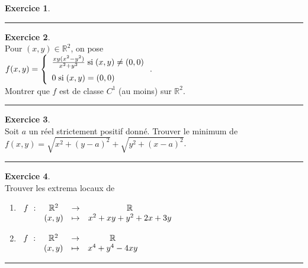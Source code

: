 \documentclass[a4paper,10pt]{article}
\theoremstyle{definition}
\theoremstyle{definition}
\newtheorem{exo}{Exercice}
\newcommand{\R}{\mathbb{R}}
\begin{document}
\begin{minipage}{1\linewidth}
\begin{minipage}[t]{0.48\linewidth}
\begin{exo}
		\centering
		\rule{1\linewidth}{0.6pt}
	\end{exo}

		
	\end{minipage}	
	\hfill\vrule\hfill
	\begin{minipage}[t]{0.48\linewidth}
		\raggedright
		
			
		
		\begin{exo}\quad\\[0.2cm]
			Pour  $(x,y)\in\R^2$, on pose \\[0.2cm]$f(x,y) =\left\{
			\begin{array}{l}
			\frac{xy(x^2-y^2)}{x^2+y^2}\;\text{si}\;(x,y)\neq(0,0)\\
			\rule{0mm}{5mm}0\;\text{si}\;(x,y)=(0,0)
			\end{array}
			\right.$.\hfil\\[0.2cm] Montrer que $f$ est de classe $C^1$ (au moins) sur $\R^2$.
			
			
			\centering
			\rule{1\linewidth}{0.6pt}
		\end{exo}
		
		\begin{exo}\quad\\[0.2cm]
			Soit $a$ un réel strictement positif donné. Trouver le minimum de $f(x,y)=\sqrt{x^2+(y-a)^2}+\sqrt{y^2+(x-a)^2}$.
			
			\centering
			\rule{1\linewidth}{0.6pt}
		\end{exo}
	
		\begin{exo}\quad\\[0.2cm]
			Trouver les extrema locaux de 
			
			\begin{enumerate}
				\item  $\begin{array}[t]{cccc}
				f~:&\R^2&\rightarrow&\R\\
				&(x,y)&\mapsto&x^2+xy+y^2+2x+3y
				\end{array}$ 
				\item  $\begin{array}[t]{cccc}
				f~:&\R^2&\rightarrow&\R\\
				&(x,y)&\mapsto&x^4+y^4-4xy
				\end{array}$ 
			\end{enumerate}
			
			\centering
			\rule{1\linewidth}{0.6pt}
		\end{exo}	
		
	

		
		
		
		
	\end{minipage}
\end{minipage}	
\end{document}
